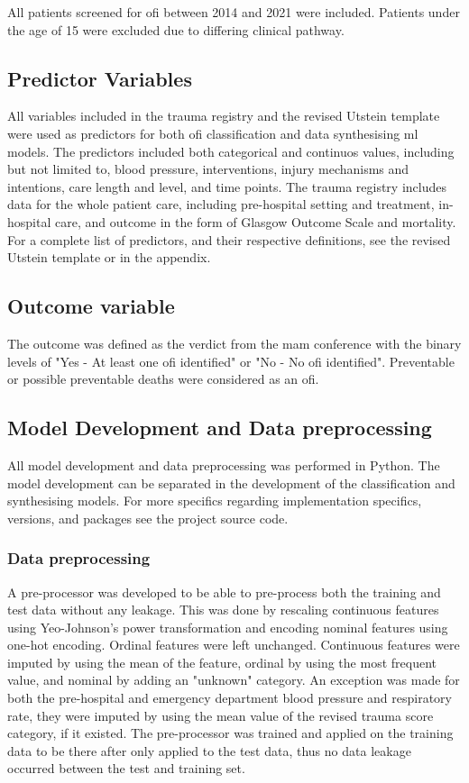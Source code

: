 \documentclass[12pt, letterpaper]{article}
\begin{document}
All patients screened for \acrshort{ofi} between 2014 and 2021 were included. Patients under the age of 15 were excluded due to differing clinical pathway.

\subsection{Predictor Variables}
All variables included in the trauma registry and the revised Utstein template were used as predictors for both \acrshort{ofi} classification and data synthesising \acrshort{ml} models. The predictors included both categorical and continuos values, including but not limited to, blood pressure, interventions, injury mechanisms and intentions, care length and level, and time points. The trauma registry includes data for the whole patient care, including pre-hospital setting and treatment, in-hospital care, and outcome in the form of Glasgow Outcome Scale and mortality. For a complete list of predictors, and their respective definitions, see the revised Utstein template \cite{ringdal_utstein_2008} or  in the appendix.

\subsection{Outcome variable}
The outcome was defined as the verdict from the \acrshort{mam} conference with the binary levels of "Yes - At least one \acrshort{ofi} identified" or "No - No \acrshort{ofi} identified". Preventable or possible preventable deaths were considered as an \acrshort{ofi}.

\subsection{Model Development and Data preprocessing}
All model development and data preprocessing was performed in Python. The model development can be separated in the development of the classification and synthesising models. For more specifics regarding implementation specifics, versions, and packages see the project source code.

\subsubsection*{Data preprocessing}
A pre-processor was developed to be able to pre-process both the training and test data without any leakage. This was done by rescaling continuous features using Yeo-Johnson's power transformation \cite{yeo_new_2000} and encoding nominal features using one-hot encoding. Ordinal features were left unchanged. Continuous features were imputed by using the mean of the feature, ordinal by using the most frequent value, and nominal by adding an "unknown" category. An exception was made for both the pre-hospital and emergency department blood pressure and respiratory rate, they were imputed by using the mean value of the revised trauma score category, if it existed. The pre-processor was trained and applied on the training data to be there after only applied to the test data, thus no data leakage occurred between the test and training set.
\end{document}
